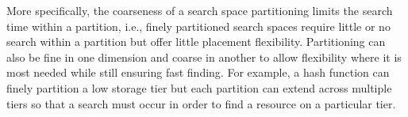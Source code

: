 More specifically, the coarseness of a search space partitioning limits the
search time within a partition, i.e., finely partitioned search spaces require
little or no search within a partition but offer little placement flexibility.
Partitioning can also be fine in one dimension and coarse in another to allow
flexibility where it is most needed while still ensuring fast finding. For
example, a hash function can finely partition a low storage tier but each
partition can extend across multiple tiers so that a search must occur in order
to find a resource on a particular tier. 


